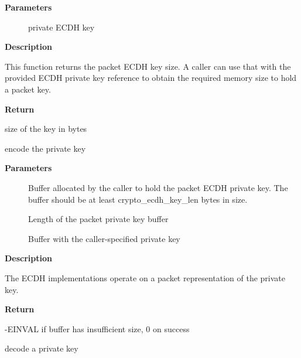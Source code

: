 \documentclass[a4paper,8pt,english]{sphinxmanual}
\begin{document}
\textbf{Parameters}
\begin{description}
\item[{}] \leavevmode
private ECDH key

\end{description}

\textbf{Description}

This function returns the packet ECDH key size. A caller can use that
with the provided ECDH private key reference to obtain the required
memory size to hold a packet key.

\textbf{Return}

size of the key in bytes

\begin{fulllineitems}
\label{crypto/api-kpp:c.crypto_ecdh_encode_key}
encode the private key

\end{fulllineitems}


\textbf{Parameters}
\begin{description}
\item[{}] \leavevmode
Buffer allocated by the caller to hold the packet ECDH
private key. The buffer should be at least crypto\_ecdh\_key\_len
bytes in size.

\item[{}] \leavevmode
Length of the packet private key buffer

\item[{}] \leavevmode
Buffer with the caller-specified private key

\end{description}

\textbf{Description}

The ECDH implementations operate on a packet representation of the private
key.

\textbf{Return}

-EINVAL if buffer has insufficient size, 0 on success

\begin{fulllineitems}
\label{crypto/api-kpp:c.crypto_ecdh_decode_key}
decode a private key

\end{fulllineitems}
\end{document}
